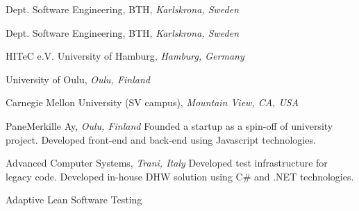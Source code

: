 \documentclass[9pt]{article}
\begin{document}
\noindent Dept. Software Engineering, BTH, \emph{Karlskrona, Sweden} \vspace{0.01in} 
\newline{}
\bigskip

\noindent Dept. Software Engineering, BTH, \emph{Karlskrona, Sweden} \vspace{0.01in} 
\newline{}
\bigskip

\noindent HITeC e.V. \amper{} University of Hamburg, \emph{Hamburg, Germany} \vspace{0.01in} 
\newline{}
\bigskip

\noindent University of Oulu, \emph{Oulu, Finland} \vspace{0.01in} 
\newline{}
\bigskip

\noindent Carnegie Mellon University (SV campus), \emph{Mountain View, CA, USA} \vspace{0.01in}  
\newline{}
\bigskip

\noindent PaneMerkille Ay, \emph{Oulu, Finland} \vspace{0.01in} 
\newline{}
\newline\noindent Founded a startup as a spin-off of university project.
\newline\noindent Developed front-end and back-end using Javascript technologies.
\bigskip

\noindent Advanced Computer Systems, \emph{Trani, Italy} \vspace{0.01in} 
\newline{}
\newline\noindent Developed test infrastructure for legacy code.
\newline\noindent Developed in-house DHW solution using C\# and .NET technologies.
\bigskip

  
\newline\noindent Adaptive Lean Software Testing 
\bigskip
\end{document}
